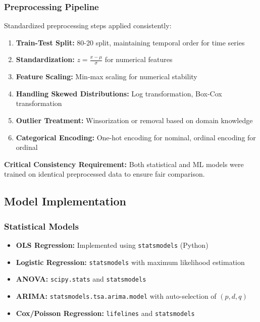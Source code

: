 \documentclass[11pt,a4paper]{article}
\begin{document}
\subsubsection{Preprocessing Pipeline}

Standardized preprocessing steps applied consistently:

\begin{enumerate}
    \item \textbf{Train-Test Split:} 80-20 split, maintaining temporal order for time series
    \item \textbf{Standardization:} $z = \frac{x - \mu}{\sigma}$ for numerical features
    \item \textbf{Feature Scaling:} Min-max scaling for numerical stability
    \item \textbf{Handling Skewed Distributions:} Log transformation, Box-Cox transformation
    \item \textbf{Outlier Treatment:} Winsorization or removal based on domain knowledge
    \item \textbf{Categorical Encoding:} One-hot encoding for nominal, ordinal encoding for ordinal
\end{enumerate}

\textbf{Critical Consistency Requirement:} Both statistical and ML models were trained on identical preprocessed data to ensure fair comparison.

\subsection{Model Implementation}

\subsubsection{Statistical Models}

\begin{itemize}
    \item \textbf{OLS Regression:} Implemented using \texttt{statsmodels} (Python)
    \item \textbf{Logistic Regression:} \texttt{statsmodels} with maximum likelihood estimation
    \item \textbf{ANOVA:} \texttt{scipy.stats} and \texttt{statsmodels}
    \item \textbf{ARIMA:} \texttt{statsmodels.tsa.arima.model} with auto-selection of $(p,d,q)$
    \item \textbf{Cox/Poisson Regression:} \texttt{lifelines} and \texttt{statsmodels}
\end{itemize}
\end{document}
